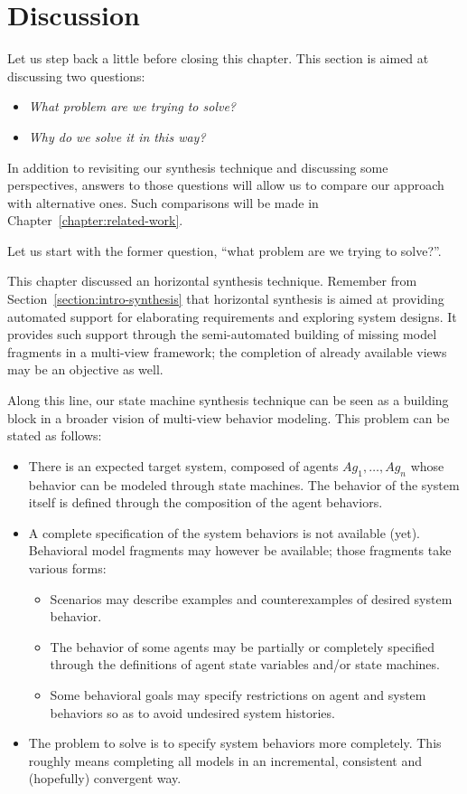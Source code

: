 \section{Discussion\label{section:inductive-discussion}}

Let us step back a little before closing this chapter. This section is aimed at discussing two questions:
\begin{itemize}
\item \emph{What problem are we trying to solve?}
\item \emph{Why do we solve it in this way?}
\end{itemize}
In addition to revisiting our synthesis technique and discussing some perspectives, answers to those questions will allow us to compare our approach with alternative ones. Such comparisons will be made in Chapter~\ref{chapter:related-work}. 

Let us start with the former question, ``what problem are we trying to solve?''. 

This chapter discussed an horizontal synthesis technique. Remember from Section~\ref{section:intro-synthesis} that horizontal synthesis is aimed at providing automated support for elaborating requirements and exploring system designs. It provides such support through the semi-automated building of missing model fragments in a multi-view framework; the completion of already available views may be an objective as well.

Along this line, our state machine synthesis technique can be seen as a building block in a broader vision of multi-view behavior modeling. This problem can be stated as follows:
\begin{itemize}
\item There is an expected target system, composed of agents $Ag_1, \ldots, Ag_n$ whose behavior can be modeled through state machines. The behavior of the system itself is defined through the composition of the agent behaviors.
\item A complete specification of the system behaviors is not available (yet). Behavioral model fragments may however be available; those fragments take various forms:
\begin{itemize}
\item Scenarios may describe examples and counterexamples of desired system behavior.
\item The behavior of some agents may be partially or completely specified through the definitions of agent state variables and/or state machines.
\item Some behavioral goals may specify restrictions on agent and system behaviors so as to avoid undesired system histories.
\end{itemize}
\item The problem to solve is to specify system behaviors more completely. This roughly means completing all models in an incremental, consistent and (hopefully) convergent way.
\end{itemize}

